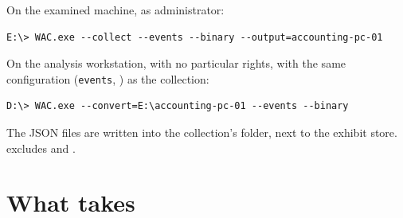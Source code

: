 \documentclass[11pt,a4paper,oneside]{report}
\begin{document}
On the examined machine, as administrator:
\begin{lstlisting}
E:\> WAC.exe --collect --events --binary --output=accounting-pc-01
\end{lstlisting}

On the analysis workstation, with no particular rights, with the same
configuration (\texttt{events}, ) as the collection:
\begin{lstlisting}
D:\> WAC.exe --convert=E:\accounting-pc-01 --events --binary
\end{lstlisting}

The JSON files are written into the collection's folder, next to the exhibit
store.  excludes  and .

\section{What  takes}
\end{document}
